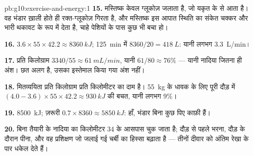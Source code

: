 \begin{solution}{pb:g10:exercise-and-energy:1}
\textbf{15.} मस्तिष्क केवल ग्लूकोज़ जलाता है, जो यकृत के  से
आता है। वह भंडार ख़ाली होते ही रक्त-ग्लूकोज़ गिरता है, और मस्तिष्क इस
आपात स्थिति का संकेत चक्कर और भारी थकावट के रूप में देता है, चाहे
पेशियों के पास कुछ भी बचा हो।

\textbf{16.} $3.6 \times 55 \times 42.2 \approx \qty{8360}{kJ}$;
\qty{125}{min} में $8360/20 = \qty{418}{L}$: यानी लगभग \qty{3.3}{L/min}।

\textbf{17.} प्रति किलोग्राम $3340/55 \approx \qty{61}{mL/min}$, यानी
$61/80 \approx 76\%$ --- यानी नादिया जितना ही अंश। छत अलग है, उसका
इस्तेमाल किया गया अंश नहीं।

\textbf{18.} मितव्ययिता प्रति किलोग्राम प्रति किलोमीटर का दाम है।
\qty{55}{kg} के धावक के लिए पूरी दौड़ में
$(4.0 - 3.6) \times 55 \times 42.2 \approx
\qty{930}{kJ}$ की बचत, यानी लगभग 9\%।

\textbf{19.}  \qty{8500}{kJ}; ज़रूरी  $0.7 \times
8360 \approx \qty{5850}{kJ}$: हाँ, भंडार बिना कुछ पिए काफ़ी हैं।

\textbf{20.} बिना तैयारी के नादिया का  किलोमीटर 34 के आसपास
चुक जाता है; दौड़ से पहले  भरना, दौड़ के दौरान
 पीना, और वह प्रशिक्षण जो जलाई गई चर्बी का हिस्सा बढ़ाता
है --- तीनों दीवार को अंतिम रेखा के पार धकेल देते हैं।
\end{solution}
